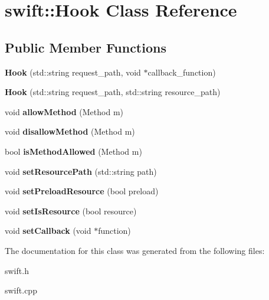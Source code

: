 \hypertarget{classswift_1_1_hook}{\section{swift\-:\-:Hook Class Reference}
\label{classswift_1_1_hook}
}
\subsection*{Public Member Functions}
\begin{DoxyCompactItemize}
\item 
\hypertarget{classswift_1_1_hook_aa394cd0e3d904efc13d1ec68f7fecb75}{{\bfseries Hook} (std\-::string request\-\_\-path, void $\ast$callback\-\_\-function)}\label{classswift_1_1_hook_aa394cd0e3d904efc13d1ec68f7fecb75}

\item 
\hypertarget{classswift_1_1_hook_a08e8c205418d4dc95a24ad10f0a6754e}{{\bfseries Hook} (std\-::string request\-\_\-path, std\-::string resource\-\_\-path)}\label{classswift_1_1_hook_a08e8c205418d4dc95a24ad10f0a6754e}

\item 
\hypertarget{classswift_1_1_hook_ab8f2a030f4234be5aaea657628414669}{void {\bfseries allow\-Method} (Method m)}\label{classswift_1_1_hook_ab8f2a030f4234be5aaea657628414669}

\item 
\hypertarget{classswift_1_1_hook_a02148f71598a14eb8c7f42d9c82f50cb}{void {\bfseries disallow\-Method} (Method m)}\label{classswift_1_1_hook_a02148f71598a14eb8c7f42d9c82f50cb}

\item 
\hypertarget{classswift_1_1_hook_ad5e71e832b6290d4f195a5dcd594e661}{bool {\bfseries is\-Method\-Allowed} (Method m)}\label{classswift_1_1_hook_ad5e71e832b6290d4f195a5dcd594e661}

\item 
\hypertarget{classswift_1_1_hook_a4147575b0d54691515271508baa428c8}{void {\bfseries set\-Resource\-Path} (std\-::string path)}\label{classswift_1_1_hook_a4147575b0d54691515271508baa428c8}

\item 
\hypertarget{classswift_1_1_hook_a8fc8a844df53bc651a46f9616ee635f9}{void {\bfseries set\-Preload\-Resource} (bool preload)}\label{classswift_1_1_hook_a8fc8a844df53bc651a46f9616ee635f9}

\item 
\hypertarget{classswift_1_1_hook_aeefe2c2e5080787975097a7c1b431161}{void {\bfseries set\-Is\-Resource} (bool resource)}\label{classswift_1_1_hook_aeefe2c2e5080787975097a7c1b431161}

\item 
\hypertarget{classswift_1_1_hook_ad7bcbc0360bf438cef8eac374919495d}{void {\bfseries set\-Callback} (void $\ast$function)}\label{classswift_1_1_hook_ad7bcbc0360bf438cef8eac374919495d}

\end{DoxyCompactItemize}


The documentation for this class was generated from the following files\-:\begin{DoxyCompactItemize}
\item 
swift.\-h\item 
swift.\-cpp\end{DoxyCompactItemize}
